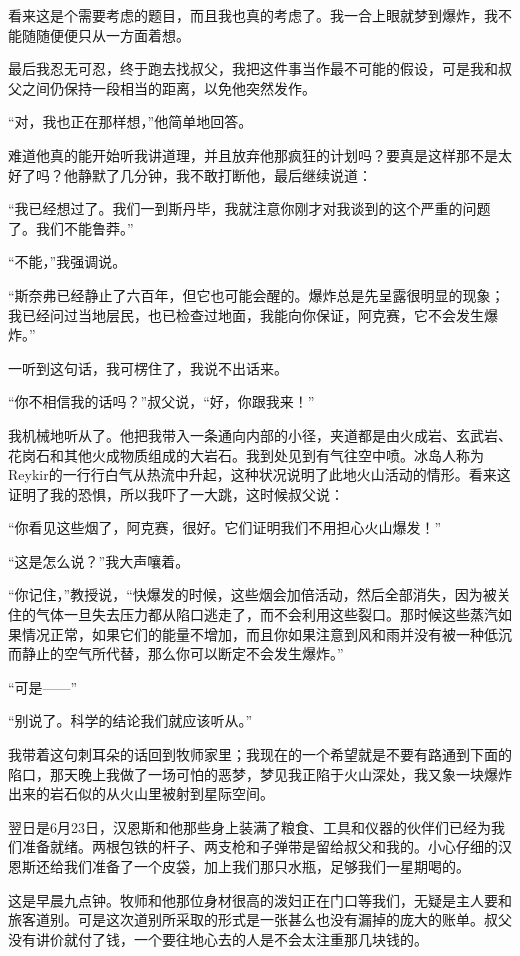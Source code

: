 \documentclass[10pt]{book}
\begin{document}
看来这是个需要考虑的题目，而且我也真的考虑了。我一合上眼就梦到爆炸，我不能随随便便只从一方面着想。

最后我忍无可忍，终于跑去找叔父，我把这件事当作最不可能的假设，可是我和叔父之间仍保持一段相当的距离，以免他突然发作。

“对，我也正在那样想，”他简单地回答。

难道他真的能开始听我讲道理，并且放弃他那疯狂的计划吗？要真是这样那不是太好了吗？他静默了几分钟，我不敢打断他，最后继续说道：

“我已经想过了。我们一到斯丹毕，我就注意你刚才对我谈到的这个严重的问题了。我们不能鲁莽。”

“不能，”我强调说。

“斯奈弗已经静止了六百年，但它也可能会醒的。爆炸总是先呈露很明显的现象；我已经问过当地层民，也已检查过地面，我能向你保证，阿克赛，它不会发生爆炸。”

一听到这句话，我可楞住了，我说不出话来。

“你不相信我的话吗？”叔父说，“好，你跟我来！”

我机械地听从了。他把我带入一条通向内部的小径，夹道都是由火成岩、玄武岩、花岗石和其他火成物质组成的大岩石。我到处见到有气往空中喷。冰岛人称为Reykir的一行行白气从热流中升起，这种状况说明了此地火山活动的情形。看来这证明了我的恐惧，所以我吓了一大跳，这时候叔父说：

“你看见这些烟了，阿克赛，很好。它们证明我们不用担心火山爆发！”

“这是怎么说？”我大声嚷着。

“你记住，”教授说，“快爆发的时候，这些烟会加倍活动，然后全部消失，因为被关住的气体一旦失去压力都从陷口逃走了，而不会利用这些裂口。那时候这些蒸汽如果情况正常，如果它们的能量不增加，而且你如果注意到风和雨并没有被一种低沉而静止的空气所代替，那么你可以断定不会发生爆炸。”

“可是——”

“别说了。科学的结论我们就应该听从。”

我带着这句刺耳朵的话回到牧师家里；我现在的一个希望就是不要有路通到下面的陷口，那天晚上我做了一场可怕的恶梦，梦见我正陷于火山深处，我又象一块爆炸出来的岩石似的从火山里被射到星际空间。

翌日是6月23日，汉恩斯和他那些身上装满了粮食、工具和仪器的伙伴们已经为我们准备就绪。两根包铁的杆子、两支枪和子弹带是留给叔父和我的。小心仔细的汉恩斯还给我们准备了一个皮袋，加上我们那只水瓶，足够我们一星期喝的。

这是早晨九点钟。牧师和他那位身材很高的泼妇正在门口等我们，无疑是主人要和旅客道别。可是这次道别所采取的形式是一张甚么也没有漏掉的庞大的账单。叔父没有讲价就付了钱，一个要往地心去的人是不会太注重那几块钱的。
\end{document}
